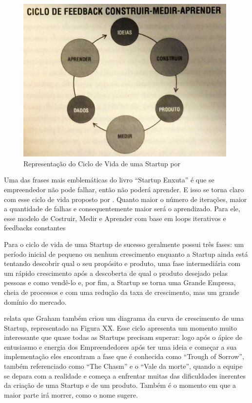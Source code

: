 \begin{figure}[!htb]
\centering
\includegraphics[width=11cm,angle=0]{figuras/ciclo_de_vida_eric_ries}
\caption{Representação do Ciclo de Vida de uma Startup por \cite{Ries2011}}
\label{Rotulo}
\end{figure}

Uma das frases mais emblemáticas do livro ``Startup Enxuta'' é que se empreendedor não pode falhar, então não poderá aprender. E isso se torna claro com esse ciclo de vida proposto por . Quanto maior o número de iterações, maior a quantidade de falhas e consequentemente maior será o aprendizado. Para ele, esse modelo de Costruir, Medir e Aprender com base em loops iterativos e feedbacks constantes

Para  o ciclo de vida de uma Startup de sucesso geralmente possui três fases: um período inicial de pequeno ou nenhum crescimento enquanto a Startup ainda está tentando descobrir qual o seu propósito e produto, uma fase intermediária com um rápido crescimento após a descoberta de qual o produto desejado pelas pessoas e como vendê-lo e, por fim, a Startup se torna uma Grande Empresa, cheia de processos e com uma redução da taxa de crescimento, mas um grande domínio do mercado.

 relata que Graham também criou um diagrama da curva de crescimento de uma Startup, representado na Figura XX. Esse ciclo apresenta um momento muito interessante que quase todas as Startups precisam superar: logo após o ápice de entusiasmo e energia dos Empreendedores após ter uma ideia e começar a sua implementação eles encontram a fase que é conhecida como ``Trough of Sorrow'', também referenciado como ``The Chasm'' e o ``Vale da morte'', quando a equipe se depara com a realidade e começa a enfrentar muitas das dificuldades inerentes da criação de uma Startup e de um produto. Também é o momento em que a maior parte irá morrer, como o nome sugere.

